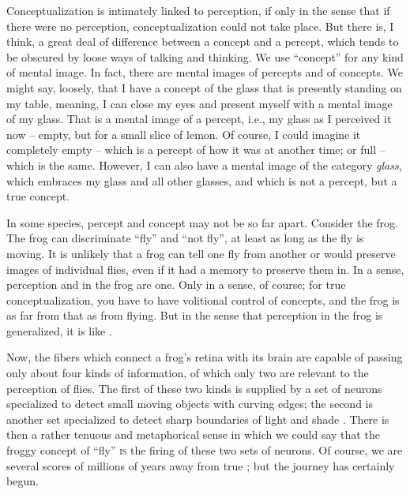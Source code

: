 Conceptualization is intimately linked to perception, if only in the sense that if there were no perception, conceptualization could not take place. But there is, I think, a great deal of difference between a concept and a percept, which tends to be obscured by loose ways of talking and thinking. We use ``concept'' for any kind of mental image. In fact, there are mental images of percepts and of concepts. We might say, loosely, that I have a concept of the glass that is presently standing on my table, meaning, I can close my eyes and present myself with a mental image of my glass. That is a mental image of a percept, i.e., my glass as I perceived it now -- empty, but for a small slice of lemon. Of course, I could imagine it completely empty -- which is a percept of how it was at another time; or full -- which is the same. However, I can also have a mental image of the category \textit{glass}, which embraces
my glass and all other glasses, and which is not a percept, but a true concept.

In some species, percept and concept may not be so far apart. Consider the frog. The frog can discriminate ``fly'' and ``not fly'', at least as long as the fly is moving. It is unlikely that a frog can tell one fly from another or would preserve  images of individual flies, even if it had a memory to preserve them in. In a sense, perception and  in the frog are one. Only in a sense, of course; for true conceptualization, you have to have volitional control of concepts, and the frog is as far from that as from flying. But in the sense that perception in the frog is generalized, it is like .

Now, the fibers which connect a frog's retina with its brain are capable of passing only about four kinds of information, of which only two are relevant to the perception of flies. The first of these two kinds is supplied by a set of neurons specialized to detect small moving objects with curving edges; the second is another set specialized to detect sharp boundaries of light and shade \citep{Burton1970}. There is then a rather tenuous and metaphorical sense in which we could say that the froggy concept of ``fly'' \textsc{is} the firing of these two sets of neurons. Of course, we are several scores of millions of years away from true ; but the journey has certainly begun.

